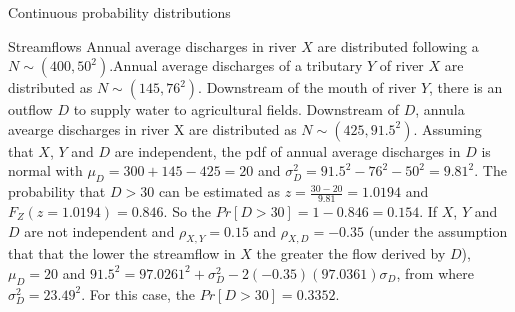 \documentclass[8pt]{beamer}
\renewcommand{\emph}[1]{\textcolor{myorange}{#1}}
\begin{document}
\begin{frame}{Continuous probability distributions} 
 \begin{exampleblock}{Streamflows} %
     Annual average discharges in river $X$ are distributed following a $N \sim (400,50^2)$.Annual average discharges of a tributary $Y$ of river $X$ are distributed as $N \sim (145, 76^2)$.  Downstream of the mouth of river $Y$, there is an outflow $D$ to supply water to agricultural fields. Downstream of $D$, annula avearge discharges in river X are distributed as $N \sim (425, 91.5^2)$. Assuming that $X$, $Y$ and $D$ are independent, the \emph{pdf} of annual average discharges in $D$ is normal with $\mu_D = 300 + 145 - 425 = 20$ and $\sigma_D^2 =91.5^2 - 76^2 - 50^2 = 9.81^2 $. The probability that $D>30$ can be estimated as $z=\frac{30-20}{9.81} = 1.0194$ and $F_Z (z=1.0194)=0.846$. So the $Pr[D > 30] = 1-0.846 = 0.154$. If $X$, $Y$ and $D$ are not independent and $\rho_{X,Y} = 0.15$ and $\rho_{X,D} = -0.35$ (under the assumption that that the lower the streamflow in $X$ the greater the flow derived by $D$), $\mu_D = 20$ and $91.5^2 = 97.0261^2 + \sigma_D^2 - 2 (-0.35)(97.0361)\sigma_D$, from where $\sigma_D^2 = 23.49^2$. For this case, the $Pr[D>30] = 0.3352$. 

 \end{exampleblock}
               
\end{frame}
\end{document}
